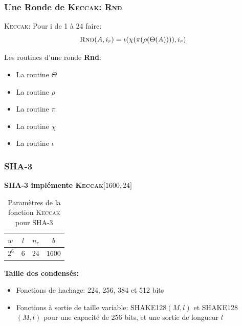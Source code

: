 \begin{frame}
  \frametitle{Une Ronde de \textsc{Keccak}: \textsc{Rnd}}
  \vfill
  \textsc{Keccak}: Pour i de 1 à 24 faire: 
$$\textsc{Rnd}(A,i_r)=\iota ( \chi ( \pi ( \rho (\Theta (A)))), i_r)$$

  \vfill

Les routines d'une ronde \textbf{Rnd}:
  \begin{itemize}
  \item{La routine $\Theta$}
  \item{La routine $\rho$}
  \item{La routine $\pi$}
  \item{La routine $\chi$}
  \item{La routine $\iota$}
   \end{itemize}
  \vfill
\end{frame}


\begin{frame}
  \frametitle{SHA-3}

\vfill
   
\centerline{\textbf{SHA-3 implémente \textsc{Keccak}$\lbrack 1600, 24 \rbrack$}}
 
\bgroup
\def\arraystretch{1.5}
  \begin{table}
\begin{tabular}{l | c | c | c }
$w$ & $l$ & $n_r$ & $b$ \\
\hline
$2^6$ & $6$ & $24$ & $1600 $ 
\end{tabular}
\caption{Paramètres de la fonction \textsc{Keccak} pour SHA-3}

\end{table}

\egroup

\vfill

\textbf{Taille des condensés:}
\begin{itemize}
\item{Fonctions de hachage: 224, 256, 384 et 512 bits}
\item{Fonctions à sortie de taille variable: \textsc{SHAKE128}$(M,l)$ et \textsc{SHAKE128}$(M,l)$  pour une capacité de 256 bits, et une sortie de longueur $l$ }
\end{itemize}
\vspace{1cm}
\vfill
\end{frame}
